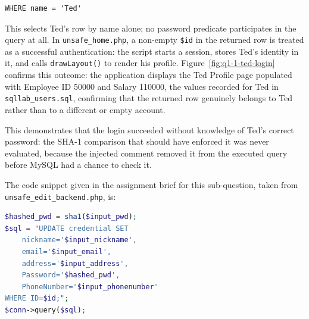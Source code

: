 \begin{lstlisting}[language={[MySQL]SQL}]
WHERE name = 'Ted'
\end{lstlisting}

This selects Ted's row by name alone; no password predicate participates in
the query at all. In \texttt{unsafe\_home.php}, a non-empty \texttt{\$id} in
the returned row is treated as a successful authentication: the script starts
a session, stores Ted's identity in it, and calls \texttt{drawLayout()} to
render his profile. Figure~\ref{fig:q1-1-ted-login} confirms this outcome:
the application displays the Ted Profile page populated with Employee ID
50000 and Salary 110000, the values recorded for Ted in
\texttt{sqllab\_users.sql}, confirming that the returned row genuinely belongs
to Ted rather than to a different or empty account.


This demonstrates that the login succeeded without knowledge of Ted's correct
password: the SHA-1 comparison that should have enforced it was never
evaluated, because the injected comment removed it from the executed query
before MySQL had a chance to check it.


The code snippet given in the assignment brief for this sub-question, taken
from \texttt{unsafe\_edit\_backend.php}, is:

\begin{lstlisting}[language=PHP]
$hashed_pwd = sha1($input_pwd);
$sql = "UPDATE credential SET
    nickname='$input_nickname',
    email='$input_email',
    address='$input_address',
    Password='$hashed_pwd',
    PhoneNumber='$input_phonenumber'
WHERE ID=$id;";
$conn->query($sql);
\end{lstlisting}

\dranswer

